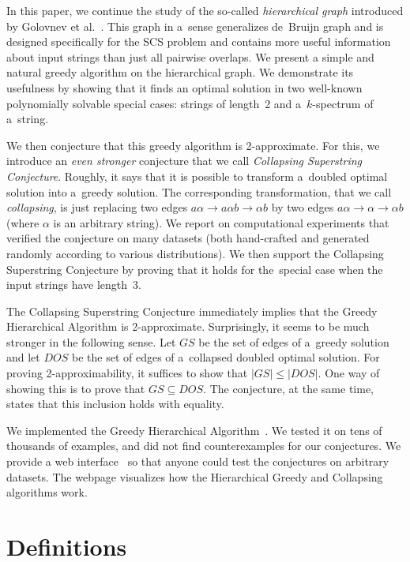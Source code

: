 \documentclass[11pt]{article}
\begin{document}
In this paper, we continue the study of the so-called {\em hierarchical graph}
introduced by Golovnev et al.~\cite{scs_exact}. This graph in a~sense generalizes de~Bruijn graph and is designed specifically 
for the SCS problem and contains more useful information about input strings
than just all pairwise overlaps. We present a simple and natural greedy algorithm
on the hierarchical graph. 
We demonstrate its usefulness by showing that it finds an optimal solution 
in two well-known polynomially solvable special cases: strings of length~2 and
a~$k$-spectrum of a~string.

We then conjecture that this greedy algorithm is 2-approximate. For this, we introduce an {\em even stronger} conjecture that we call 
{\em Collapsing Superstring Conjecture}. 
Roughly, it says that it is possible to transform a~doubled optimal 
solution into a~greedy solution. 
The corresponding transformation, that we call {\em collapsing}, 
is just replacing two edges $a\alpha \to a\alpha b \to \alpha b$ 
by two edges $a\alpha \to \alpha \to \alpha b$ (where $\alpha$ is an arbitrary string). 
We report on computational experiments that verified the 
conjecture on many datasets (both hand-crafted and generated randomly
according to various distributions). 
We then support the Collapsing Superstring Conjecture by 
proving that it holds for the~special case when the input strings have length~3.

The Collapsing Superstring Conjecture immediately implies that the Greedy
Hierarchical Algorithm is 2-approximate. Surprisingly, it seems to be much
stronger in the following sense. Let $GS$ be the set of edges of a~greedy
solution and let $DOS$ be the set of edges of a~collapsed doubled optimal
solution. For proving 2-approximability, it suffices to show that $|GS| \le |DOS|$. 
One way of showing this is to prove that $GS \subseteq DOS$. 
The conjecture, at the same time, states that this inclusion holds with equality.

We implemented the Greedy Hierarchical Algorithm~\cite{github}. We tested it on tens of thousands of examples, and did not find counterexamples for our conjectures. We provide a web interface~\cite{webpage} so that anyone could test the conjectures on arbitrary datasets. The webpage visualizes how the Hierarchical Greedy and Collapsing algorithms work.

\section{Definitions}
\end{document}
